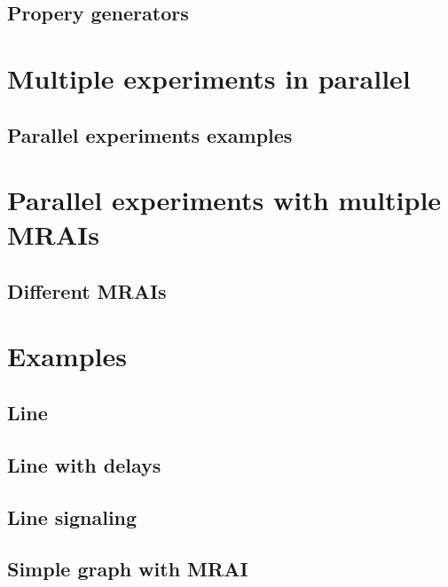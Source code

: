 \documentclass[10pt,journal,onecolumn]{IEEEtran}
\begin{document}
\subsection{Propery generators}
\label{sec:graph_propery_generators}

\section{Multiple experiments in parallel}
\label{sec:multiple_experiments}

\subsection{Parallel experiments examples}
\label{subsec:parallel_examples}

\section{Parallel experiments with multiple MRAIs}
\label{sec:parallel_mrais}

\subsection{Different MRAIs}
\label{subsec:MRAI_types}

\section{Examples}
\label{sec:examples}

\subsection{Line}
\label{subsec:ex_line}

\subsection{Line with delays}
\label{subsec:ex_line_delay}

\subsection{Line signaling}
\label{subsec:ex_line_signaling}

\subsection{Simple graph with MRAI}
\label{subsec:simple_graph_with_MRAI}
\end{document}
